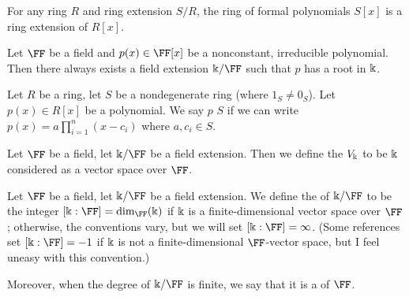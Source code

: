 \begin{proposition}
For any ring $R$ and ring extension $S/R$, the ring of formal
polynomials $S[x]$ is a ring extension of $R[x]$.
\end{proposition}

\begin{theorem}
Let $\FF$ be a field and $p(x)\in\FF[x]$ be a nonconstant, irreducible
polynomial. Then there always exists a field extension $\kk/\FF$ such
that $p$ has a root in $\Bbbk$.
\end{theorem}

\begin{definition}
Let $R$ be a ring, let $S$ be a nondegenerate ring (where $1_{S}\neq0_{S}$).
Let $p(x)\in R[x]$ be a polynomial. We say $p$  $S$ if
we can write $p(x)=a\prod^{n}_{i=1}(x-c_{i})$ where $a,c_{i}\in S$.
\end{definition}

\begin{definition}
Let $\FF$ be a field, let $\kk/\FF$ be a field extension. Then we
define the  $V_{\Bbbk}$ to be $\Bbbk$ considered as a
vector space over $\FF$.
\end{definition}

\begin{definition}
Let $\FF$ be a field, let $\kk/\FF$ be a field extension.
We define the  of $\kk/\FF$ to be the integer
$[\kk:\FF]=\dim_{\FF}(\kk)$ if $\Bbbk$ is a finite-dimensional vector
space over $\FF$; otherwise, the conventions vary, but we will set
$[\kk:\FF]=\infty$. (Some references set $[\kk:\FF]=-1$ if $\Bbbk$ is
not a finite-dimensional $\FF$-vector space, but I feel uneasy with
this convention.)

Moreover, when the degree of $\kk/\FF$ is finite, we say that it is a
 of $\FF$.
\end{definition}